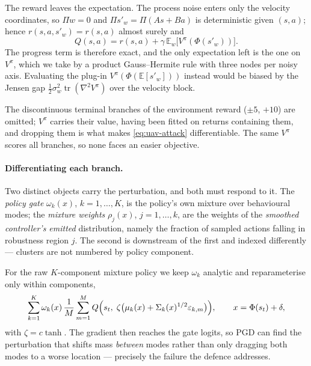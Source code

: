The reward leaves the expectation. The process noise enters only the velocity
coordinates, so $\Pi w = 0$ and $\Pi s'_w = \Pi(As + Ba)$ is deterministic given
$(s,a)$; hence $r(s,a,s'_w) = r(s,a)$ almost surely and
%
\begin{equation}
  Q(s,a) = r(s,a) + \gamma\, \mathbb{E}_{w}\bigl[V^{\pi}(\Phi(s'_w))\bigr].
  \label{eq:uav-q-split}
\end{equation}
%
The progress term is therefore exact, and the only expectation left is the one on
$V^\pi$, which we take by a product Gauss--Hermite rule with three nodes per noisy
axis. Evaluating the plug-in $V^\pi(\Phi(\mathbb{E}[s'_w]))$ instead would be
biased by the Jensen gap $\tfrac12\sigma_w^2\operatorname{tr}(\nabla^2 V^\pi)$
over the velocity block.

The discontinuous terminal branches of the environment reward ($\pm5$, $+10$) are
omitted; $V^\pi$ carries their value, having been fitted on returns containing
them, and dropping them is what makes \eqref{eq:uav-attack} differentiable. The
same $V^\pi$ scores all branches, so none faces an easier objective.

\paragraph{Differentiating each branch.} Two distinct objects carry the
perturbation, and both must respond to it. The \emph{policy gate}
$\omega_k(x)$, $k=1,\dots,K$, is the policy's own mixture over behavioural modes;
the \emph{mixture weights} $\rho_j(x)$, $j=1,\dots,k$, are the weights of the
\emph{smoothed controller's emitted} distribution, namely the fraction of sampled
actions falling in robustness region $j$. The second is downstream of the first
and indexed differently --- clusters are not numbered by policy component.

For the raw $K$-component mixture policy we keep $\omega_k$ analytic and
reparameterise only within components,
%
\begin{equation}
  \sum_{k=1}^{K}\omega_k(x)\,\frac1M\sum_{m=1}^{M}
  Q\Bigl(s_t,\;\zeta\bigl(\mu_k(x) + \Sigma_k(x)^{1/2}\varepsilon_{k,m}\bigr)\Bigr),
  \qquad x = \Phi(s_t)+\delta,
\end{equation}
%
with $\zeta = c\tanh$. The gradient then reaches the gate logits, so PGD can find
the perturbation that shifts mass \emph{between} modes rather than only dragging
both modes to a worse location --- precisely the failure the defence addresses.

